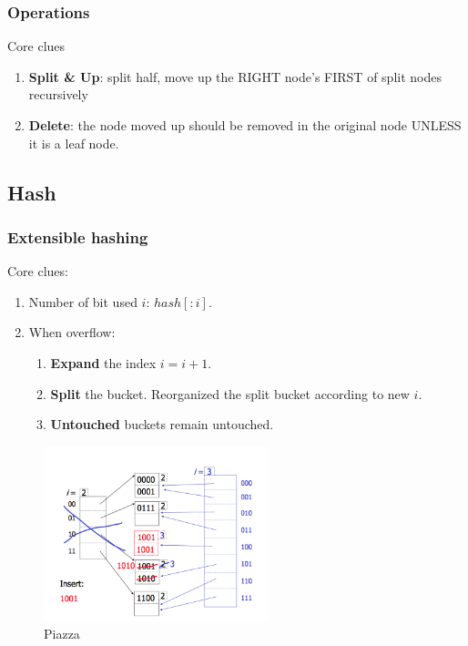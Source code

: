\documentclass{article}
\begin{document}
\subsubsection{Operations}
Core clues
\begin{enumerate}
\item \textbf{Split \& Up}: split half, move up the RIGHT node's FIRST of split nodes recursively
\item \textbf{Delete}: the node moved up should be removed in the original node UNLESS it is a leaf node. 
\end{enumerate}

\subsection{Hash}
\subsubsection{Extensible hashing}
Core clues:
\begin{enumerate}
\item Number of bit used $i$: $hash[:i]$.
\item When overflow:
  \begin{enumerate}
  \item \textbf{Expand} the index $i=i+1$.
  \item \textbf{Split} the bucket. Reorganized the split bucket according to new $i$.
  \item \textbf{Untouched} buckets remain untouched. 
  \end{enumerate}
\end{enumerate}
\begin{figure}[H]
        \centerline{\includegraphics[height = 2in]{img/extensible_hashing}}
        \caption{Piazza}
    \label{fig:extensibleHashing}
\end{figure}
\end{document}
